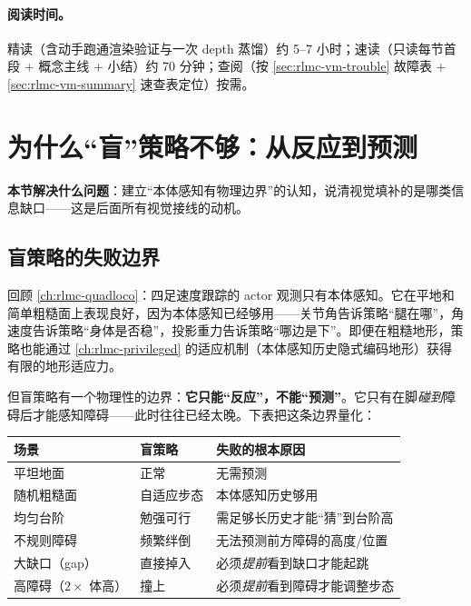 \paragraph{阅读时间。}精读（含动手跑通渲染验证与一次 depth 蒸馏）约 5--7 小时；速读（只读每节首段 + 概念主线 + 小结）约 70 分钟；查阅（按 \cref{sec:rlmc-vm-trouble} 故障表 + \cref{sec:rlmc-vm-summary} 速查表定位）按需。

\section{为什么“盲”策略不够：从反应到预测}
\label{sec:rlmc-vm-why}

\textbf{本节解决什么问题}：建立“本体感知有物理边界”的认知，说清视觉填补的是哪类信息缺口——这是后面所有视觉接线的动机。

\subsection{盲策略的失败边界}
\label{sec:rlmc-vm-blind}

回顾 \cref{ch:rlmc-quadloco}：四足速度跟踪的 actor 观测只有本体感知。它在平地和简单粗糙面上表现良好，因为本体感知已经够用——关节角告诉策略“腿在哪”，角速度告诉策略“身体是否稳”，投影重力告诉策略“哪边是下”。即便在粗糙地形，策略也能通过 \cref{ch:rlmc-privileged} 的适应机制（本体感知历史隐式编码地形）获得有限的地形适应力。

但盲策略有一个物理性的边界：\textbf{它只能“反应”，不能“预测”}。它只有在脚\emph{碰到}障碍后才能感知障碍——此时往往已经太晚。下表把这条边界量化：

\begin{center}
\small
\begin{tabular}{@{}lll@{}}
\toprule
场景 & 盲策略 & 失败的根本原因 \\
\midrule
平坦地面 & 正常 & 无需预测 \\
随机粗糙面 & 自适应步态 & 本体感知历史够用 \\
均匀台阶 & 勉强可行 & 需足够长历史才能“猜”到台阶高 \\
不规则障碍 & 频繁绊倒 & 无法预测前方障碍的高度/位置 \\
大缺口（gap） & 直接掉入 & 必须\emph{提前}看到缺口才能起跳 \\
高障碍（$2\times$ 体高） & 撞上 & 必须\emph{提前}看到障碍才能调整步态 \\
\bottomrule
\end{tabular}
\end{center}

